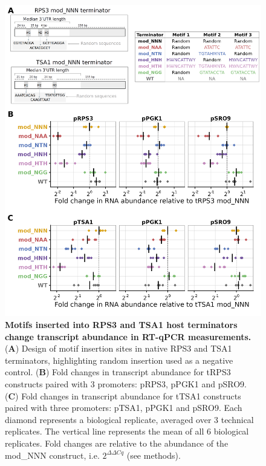 \documentclass{SBCbookchapter}
\begin{document}
\begin{figure}[p]

{\centering \includegraphics[width=0.98\linewidth]{figures/insertion_constructs_design_and_qpcr} 

}

\caption{\textbf{Motifs inserted into RPS3 and TSA1 host terminators change transcript abundance in RT-qPCR measurements.} (\textbf{A}) Design of motif insertion sites in native RPS3 and TSA1 terminators, highlighting random insertion used as a negative control. (\textbf{B}) Fold changes in transcript abundance for tRPS3 constructs paired with 3 promoters: pRPS3, pPGK1 and pSRO9. (\textbf{C}) Fold changes in transcript abundance for tTSA1 constructs paired with three promoters: pTSA1, pPGK1 and pSRO9. Each diamond represents a biological replicate, averaged over 3 technical replicates. The vertical line represents the mean of all 6 biological replicates. Fold changes are relative to the abundance of the mod\_NNN construct, i.e. $2^{\Delta\Delta Cq}$ (see methods).}\label{fig:tRPS3-tTSA1-design-and-qpcr}
\end{figure}
\end{document}
